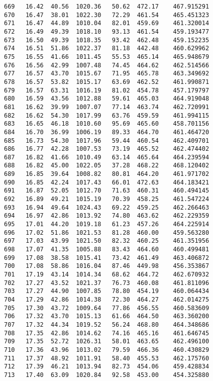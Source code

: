 \documentclass[11pt]{article}
\begin{document}
\begin{tcolorbox}[breakable, size=fbox, boxrule=.5pt, pad at break*=1mm, opacityfill=0]
\begin{Verbatim}[commandchars=\\\{\}]
669   16.42  40.56  1020.36   50.62  472.17    467.915291
670   16.47  38.01  1022.30   72.29  461.54    465.451323
671   16.47  44.89  1010.04   82.01  459.69    461.320014
672   16.49  49.39  1018.10   93.13  461.54    459.193477
673   16.50  49.39  1018.35   93.42  462.48    459.152235
674   16.51  51.86  1022.37   81.18  442.48    460.629962
675   16.55  41.66  1011.45   55.53  465.14    465.948679
676   16.56  42.99  1007.48   74.45  464.62    462.514566
677   16.57  43.70  1015.67   71.95  465.78    463.349692
678   16.57  53.82  1015.17   63.69  462.52    461.990871
679   16.57  63.31  1016.19   81.02  454.78    457.179797
680   16.59  43.56  1012.88   59.61  465.03    464.919048
681   16.62  39.99  1007.07   77.14  463.74    462.720991
682   16.62  54.30  1017.99   63.76  459.59    461.994115
683   16.65  46.18  1010.60   95.69  465.60    458.701156
684   16.70  36.99  1006.19   89.33  464.70    461.464720
685   16.73  54.30  1017.96   59.44  460.54    462.409701
686   16.77  42.28  1007.53   73.19  465.52    462.474402
687   16.82  41.66  1010.49   63.14  465.64    464.239594
688   16.82  45.00  1022.05   37.28  468.22    468.120402
689   16.85  39.64  1008.82   80.81  464.20    461.971702
690   16.85  42.24  1017.43   66.01  472.63    464.183421
691   16.87  52.05  1012.70   71.63  460.31    460.494145
692   16.89  49.21  1015.19   70.39  458.25    461.547224
693   16.94  49.64  1024.43   69.22  459.25    462.266463
694   16.97  42.86  1013.92   74.80  463.62    462.229359
695   17.01  44.20  1019.18   61.23  457.26    464.225914
696   17.02  51.86  1021.53   81.28  460.00    459.563280
697   17.03  43.99  1021.50   82.32  460.25    461.351956
698   17.07  41.35  1005.88   83.43  464.60    460.499481
699   17.08  38.58  1015.41   73.42  461.49    463.406872
700   17.08  58.86  1016.04   87.46  449.98    456.353867
701   17.19  43.14  1014.34   68.62  464.72    462.670932
702   17.27  43.52  1021.37   76.73  460.08    461.811096
703   17.27  44.90  1007.85   78.80  454.19    460.064434
704   17.29  42.86  1014.38   72.30  464.27    462.014275
705   17.30  43.72  1009.64   77.86  456.55    460.583609
706   17.32  43.70  1015.13   61.66  464.50    463.360200
707   17.32  44.34  1019.52   56.24  468.80    464.348686
708   17.35  42.86  1014.62   74.16  465.16    461.646745
709   17.35  52.72  1026.31   58.01  463.65    462.496100
710   17.36  43.96  1013.02   79.59  466.36    460.430829
711   17.37  48.92  1011.91   58.40  455.53    462.175760
712   17.39  46.21  1013.94   82.73  454.06    459.428834
713   17.40  63.09  1020.84   92.58  453.00    454.325880

\end{Verbatim}
\end{tcolorbox}
\end{document}
